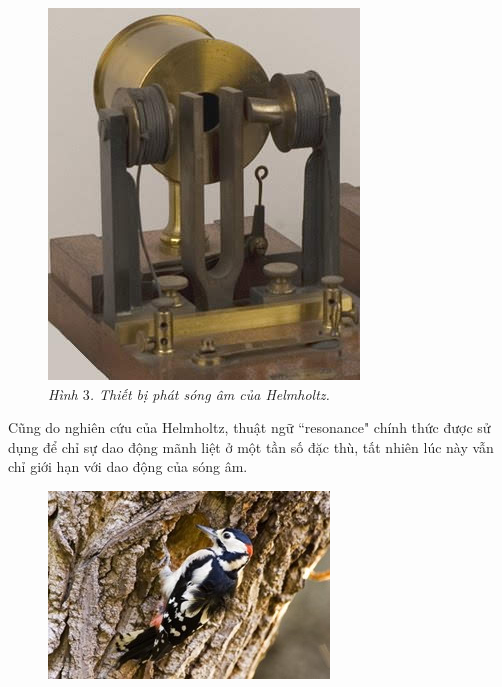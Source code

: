 \begin{multicols}{2}
\begin{figure}[H]
		\captionsetup{labelformat= empty, justification=centering}
		\includegraphics[width=1\linewidth]{5}
		\caption{\small\textit{\color{timhieukhoahoc}Hình $3$. Thiết bị phát sóng âm của Helmholtz.}}
		\vspace*{-10pt}
	\end{figure}
	Cũng do nghiên cứu của Helmholtz, thuật ngữ ``resonance" chính thức được sử dụng để chỉ sự dao động mãnh liệt ở một tần số đặc thù, tất nhiên lúc này vẫn chỉ giới hạn với dao động của sóng âm.
	\begin{figure}[H]
		\centering
		\vspace*{-5pt}
		\captionsetup{labelformat= empty, justification=centering}
		\includegraphics[width=1\linewidth]{6}

\end{figure}
\end{multicols}
